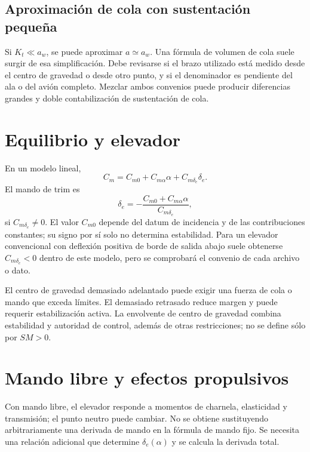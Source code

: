 \subsection{Aproximación de cola con sustentación pequeña}
Si $K_t\ll a_w$, se puede aproximar $a\simeq a_w$. Una fórmula de volumen de cola suele surgir de esa simplificación. Debe revisarse si el brazo utilizado está medido desde el centro de gravedad o desde otro punto, y si el denominador es pendiente del ala o del avión completo. Mezclar ambos convenios puede producir diferencias grandes y doble contabilización de sustentación de cola.


\section{Equilibrio y elevador}
En un modelo lineal,
\begin{equation}
C_m=C_{m0}+C_{m\alpha}\alpha+C_{m\delta_e}\delta_e.
\end{equation}
El mando de trim es
\begin{equation}
\delta_e=-\frac{C_{m0}+C_{m\alpha}\alpha}{C_{m\delta_e}},
\end{equation}
si $C_{m\delta_e}\neq0$. El valor $C_{m0}$ depende del datum de incidencia y de las contribuciones constantes; su signo por sí solo no determina estabilidad. Para un elevador convencional con deflexión positiva de borde de salida abajo suele obtenerse $C_{m\delta_e}<0$ dentro de este modelo, pero se comprobará el convenio de cada archivo o dato.

El centro de gravedad demasiado adelantado puede exigir una fuerza de cola o mando que exceda límites. El demasiado retrasado reduce margen y puede requerir estabilización activa. La envolvente de centro de gravedad combina estabilidad y autoridad de control, además de otras restricciones; no se define sólo por $SM>0$.

\section{Mando libre y efectos propulsivos}
Con mando libre, el elevador responde a momentos de charnela, elasticidad y transmisión; el punto neutro puede cambiar. No se obtiene sustituyendo arbitrariamente una derivada de mando en la fórmula de mando fijo. Se necesita una relación adicional que determine $\delta_e(\alpha)$ y se calcula la derivada total.

